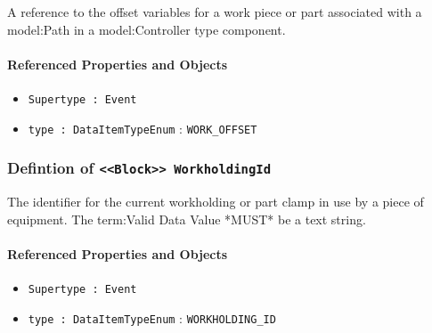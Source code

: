 \FloatBarrier

A reference to the offset variables for a work piece or part associated with a {model:Path} in a {model:Controller} type component.

\FloatBarrier
\paragraph{Referenced Properties and Objects}

\begin{itemize}
\item \texttt{Supertype : Event}

\item \texttt{type : DataItemTypeEnum} : \texttt{WORK_OFFSET}

\end{itemize}
\FloatBarrier
\subsubsection{Defintion of \texttt{<<Block>> WorkholdingId}}
  \label{type:WorkholdingId}

\FloatBarrier

The identifier for the current workholding or part clamp in use by a piece of equipment. 
 The {term:Valid Data Value} *MUST* be a text string.

\FloatBarrier
\paragraph{Referenced Properties and Objects}

\begin{itemize}
\item \texttt{Supertype : Event}

\item \texttt{type : DataItemTypeEnum} : \texttt{WORKHOLDING_ID}

\end{itemize}
\FloatBarrier
